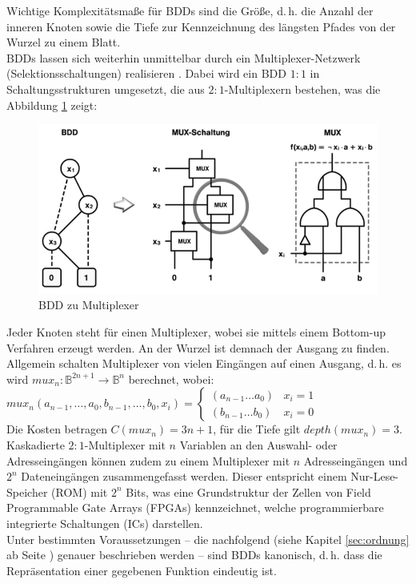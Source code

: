 Wichtige Komplexitätsmaße für BDDs sind die Größe, d.\,h. die Anzahl der inneren Knoten sowie die Tiefe zur Kennzeichnung des längsten Pfades von der Wurzel zu einem Blatt.\\
BDDs lassen sich weiterhin unmittelbar durch ein Multiplexer-Netzwerk (Selektionsschaltungen) realisieren \cite{adk1991}. Dabei wird ein BDD $1:1$ in Schaltungsstrukturen umgesetzt, die aus $2:1$-Multiplexern bestehen, was die Abbildung \ref{fig:bddToMux} zeigt:
\begin{figure}[bth]
	\centering
	\includegraphics[scale=0.4]{./img/mux}
	\caption[BDD zu Multiplexer]{BDD zu Multiplexer \cite[S.46]{h2002}}
	\label{fig:bddToMux}
\end{figure}
\noindent
Jeder Knoten steht für einen Multiplexer, wobei sie mittels einem Bottom-up Verfahren erzeugt werden. An der Wurzel ist demnach der Ausgang zu finden.\\
Allgemein schalten Multiplexer von vielen Eingängen auf einen Ausgang, d.\,h. es wird $mux_n : \mathbb{B}^{2n+1} \rightarrow \mathbb{B}^n$ berechnet, wobei:\\
$mux_n(a_{n-1}, \dots, a_0, b_{n-1}, \dots, b_0, x_i) = \begin{cases}(a_{n-1} \dots a_0)& x_i = 1 \\ (b_{n-1} \dots b_0) & x_i = 0 \end{cases}$\\
Die Kosten betragen $C(mux_n) = 3n+1$, für die Tiefe gilt $depth(mux_n) = 3$.\\
Kaskadierte $2:1$-Multiplexer mit $n$ Variablen an den Auswahl- oder Adresseingängen können zudem zu einem Multiplexer mit $n$ Adresseingängen und $2^n$ Dateneingängen zusammengefasst werden. Dieser entspricht einem Nur-Lese-Speicher (ROM) mit $2^n$ Bits, was eine Grundstruktur der Zellen von Field Programmable Gate Arrays (FPGAs) kennzeichnet, welche programmierbare integrierte Schaltungen (ICs) darstellen.\\
Unter bestimmten Voraussetzungen -- die nachfolgend (siehe Kapitel \ref{sec:ordnung} ab Seite \pageref{sec:ordnung}) genauer beschrieben werden -- sind BDDs kanonisch, d.\,h. dass die Repräsentation einer gegebenen Funktion eindeutig ist.
